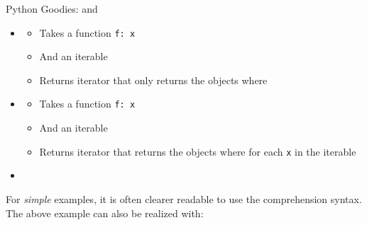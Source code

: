 \begin{frame}[fragile]{Python Goodies:  and }
%
\begin{itemize}
\item {}
	\begin{itemize}
	\item Takes a function \texttt{f: x} \thus {}
	\item And an iterable
	\item Returns iterator that only returns the objects where 
	\end{itemize}
\item {}
	\begin{itemize}
	\item Takes a function \texttt{f: x} \thus {}
	\item And an iterable
	\item Returns iterator that returns the objects where  for each \texttt{x} in the iterable
	\end{itemize}
\item[\Thus] 
\end{itemize}
%
\begin{hintbox}
\footnotesize
For \emph{simple} examples, it is often clearer readable to use the comprehension syntax. The above example can also be realized with:
\end{hintbox}
%
\end{frame}


